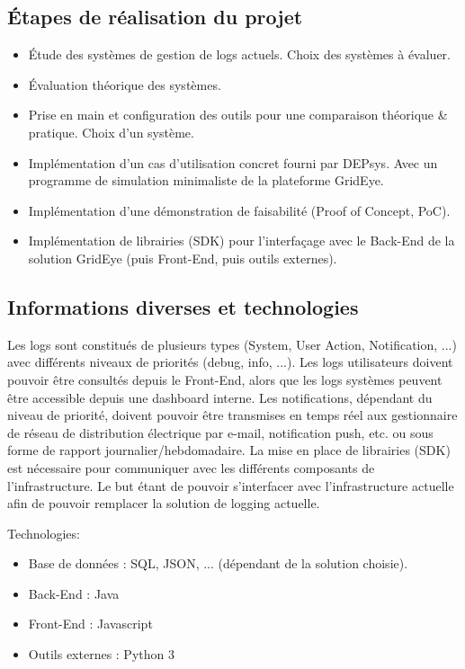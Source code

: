 \documentclass[paper=a4, fontsize=11pt]{scrartcl}
\begin{document}
\subsection*{Étapes de réalisation du projet}

\begin{itemize}
    \item Étude des systèmes de gestion de logs actuels.
    \subitem Choix des systèmes à évaluer.
    \item Évaluation théorique des systèmes.
    \item Prise en main et configuration des outils pour une comparaison théorique \& pratique.
    \subitem Choix d'un système.
    \item Implémentation d'un cas d'utilisation concret fourni par DEPsys.
    \subitem Avec un programme de simulation minimaliste de la plateforme GridEye.
    \item Implémentation d'une démonstration de faisabilité (Proof of Concept, PoC).
    \item Implémentation de librairies (SDK) pour l'interfaçage avec le Back-End de la solution GridEye (puis Front-End, puis outils externes).
\end{itemize}

\subsection*{Informations diverses et technologies}
Les logs sont constitués de plusieurs types (System, User Action, Notification, ...) avec différents niveaux de priorités (debug, info, ...). Les logs utilisateurs doivent pouvoir être consultés depuis le Front-End, alors que les logs systèmes peuvent être accessible depuis une dashboard interne. Les notifications, dépendant du niveau de priorité, doivent pouvoir être transmises en temps réel aux gestionnaire de réseau de distribution électrique  par e-mail, notification push, etc. ou sous forme de rapport journalier/hebdomadaire. La mise en place de librairies (SDK) est nécessaire pour communiquer avec les différents composants de l'infrastructure. Le but étant de pouvoir s'interfacer avec l'infrastructure actuelle afin de pouvoir remplacer la solution de logging actuelle.

Technologies:

\begin{itemize}
    \item Base de données : SQL, JSON, ... (dépendant de la solution choisie).
    \item Back-End : Java
    \item Front-End : Javascript 
    \item Outils externes : Python 3
\end{itemize}
\newpage
\end{document}
